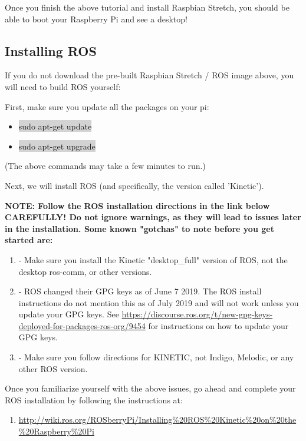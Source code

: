 \documentclass{article}
\begin{document}
\noindent Once you finish the above tutorial and install Raspbian Stretch, you should be able to boot your Raspberry Pi and see a desktop!

\subsection{Installing ROS}
If you do not download the pre-built Raspbian Stretch / ROS image above, you will need to build ROS yourself:

First, make sure you update all the packages on your pi:
\begin{itemize}
	\item[] \colorbox{lightgray}{sudo apt-get update}
	\item[] \colorbox{lightgray}{sudo apt-get upgrade}
\end{itemize}
(The above commands may take a few minutes to run.)

\bigskip

\noindent Next, we will install ROS (and specifically, the version called 'Kinetic').

\textbf{NOTE: Follow the ROS installation directions in the link below CAREFULLY!  Do not ignore warnings, as they will lead to issues later in the installation.  Some known "gotchas" to note before you get started are:}
\begin{enumerate}
	\item[] - Make sure you install the Kinetic "desktop\_full" version of ROS, not the desktop ros-comm, or other versions.
	\item[] - ROS changed their GPG keys as of June 7 2019.  The ROS install instructions do not mention this as of July 2019 and will not work unless you update your GPG keys. See \href{https://discourse.ros.org/t/new-gpg-keys-deployed-for-packages-ros-org/9454}{https://discourse.ros.org/t/new-gpg-keys-deployed-for-packages-ros-org/9454} for instructions on how to update your GPG keys.
	\item[] - Make sure you follow directions for KINETIC, not Indigo, Melodic, or any other ROS version.
\end{enumerate}

\noindent Once you familiarize yourself with the above issues, go ahead and complete your ROS installation by following the instructions at:
\begin{enumerate}
	\item[] \href{http://wiki.ros.org/ROSberryPi/Installing%20ROS%20Kinetic%20on%20the%20Raspberry%20Pi}{http://wiki.ros.org/ROSberryPi/Installing\%20ROS\%20Kinetic\%20on\%20the\%20Raspberry\%20Pi}
\end{enumerate}
\end{document}
